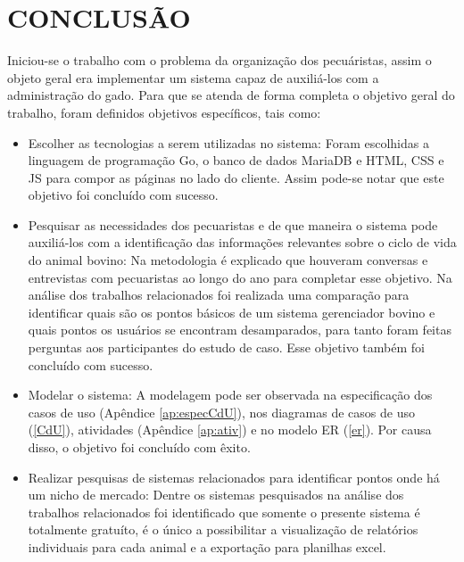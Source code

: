 %
%


\chapter{\textbf{CONCLUSÃO}}\label{chap:conclusao}

Iniciou-se o trabalho com o problema da organização dos pecuáristas, assim o objeto geral era implementar um sistema capaz de auxiliá-los com a administração do gado. Para que se atenda de forma completa o objetivo geral do trabalho, foram definidos objetivos específicos, tais como:

\begin{itemize}
	\item Escolher as tecnologias a serem utilizadas no sistema:
	\newline
	Foram escolhidas a linguagem de programação Go, o banco de dados MariaDB e HTML, CSS e JS para compor as páginas no lado do cliente. Assim pode-se notar que este objetivo foi concluído com sucesso.

	\item Pesquisar as necessidades dos pecuaristas e de que maneira o sistema pode auxiliá-los com a identificação das informações relevantes sobre o ciclo de vida do animal bovino:
	\newline
	Na metodologia é explicado que houveram conversas e entrevistas com pecuaristas ao longo do ano para completar esse objetivo.	Na análise dos trabalhos relacionados foi realizada uma comparação para identificar quais são os pontos básicos de um sistema gerenciador bovino e quais pontos os usuários se encontram desamparados, para tanto foram feitas perguntas aos participantes do estudo de caso. Esse objetivo também foi concluído com sucesso.

	\item Modelar o sistema:
	\newline
	A modelagem pode ser observada na especificação dos casos de uso (Apêndice \ref{ap:especCdU}),  nos diagramas de casos de uso (\ref{CdU}), atividades (Apêndice \ref{ap:ativ}) e no modelo ER (\ref{er}). Por causa disso, o objetivo foi concluído com êxito.


	\item Realizar pesquisas de sistemas relacionados para identificar pontos onde há um nicho de mercado:
	\newline
	Dentre os sistemas pesquisados na análise dos trabalhos relacionados foi identificado que somente o presente sistema é totalmente gratuíto, é o único a possibilitar a visualização de relatórios individuais para cada animal e a exportação para planilhas excel.


\end{itemize}
